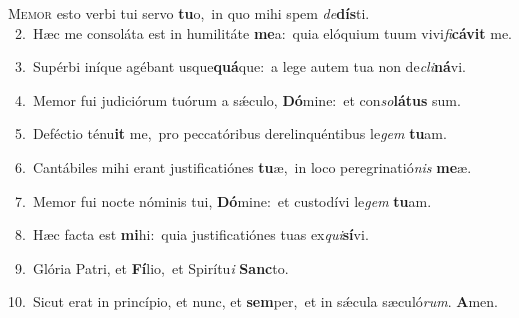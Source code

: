 \lettrine{\initial\textcolor{\initialcolor}{M}}{emor} esto verbi tui servo \textbf{tu}\-o,~\star in quo mihi spem \textit{de}\-\textbf{dís}ti.\\
{\numbfont\textcolor{\numbcolor}{~2.}}~Hæc me consoláta est in humilitáte \textbf{me}\-a:~\star quia elóquium tuum vivi\-\textit{fi}\-\textbf{cá}\textbf{vit} me.\par
{\numbfont\textcolor{\numbcolor}{~3.}}~Supérbi iníque agébant usque\-\textbf{quá}\-que:~\star a lege autem tua non de\-\textit{cli}\-\textbf{ná}vi.\par
{\numbfont\textcolor{\numbcolor}{~4.}}~Memor fui judiciórum tuórum a sǽculo, \textbf{Dó}\-mine:~\star et con\-\textit{so}\-\textbf{lá}\textbf{tus} sum.\par
{\numbfont\textcolor{\numbcolor}{~5.}}~Deféctio ténu\textbf{it} me,~\star pro peccatóribus derelinquéntibus le\textit{gem} \textbf{tu}\-am.\par
{\numbfont\textcolor{\numbcolor}{~6.}}~Cantábiles mihi erant justificatiónes \textbf{tu}\-æ,~\star in loco peregrinatió\textit{nis} \textbf{me}\-æ.\par
{\numbfont\textcolor{\numbcolor}{~7.}}~Memor fui nocte nóminis tui, \textbf{Dó}\-mine:~\star et custodívi le\textit{gem} \textbf{tu}\-am.\par
{\numbfont\textcolor{\numbcolor}{~8.}}~Hæc facta est \textbf{mi}\-hi:~\star quia justificatiónes tuas ex\-\textit{qui}\-\textbf{sí}vi.\par
{\numbfont\textcolor{\numbcolor}{~9.}}~Glória Patri, et \textbf{Fí}\-lio,~\star et Spirítu\textit{i} \textbf{Sanc}\-to.\par
{\numbfont\textcolor{\numbcolor}{10.}}~Sicut erat in princípio, et nunc, et \textbf{sem}\-per,~\star et in sǽcula sæculó\-\textit{rum}\-. \textbf{A}\-men.\par
